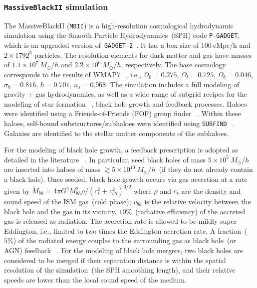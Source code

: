 \documentclass[twocolumn,trackchanges]{aastex63}
\newcommand{\mbii}{\texttt{MBII}}
\begin{document}
\subsubsection{\texttt{MassiveBlackII} simulation}
The MassiveBlackII (\mbii) is a high-resolution cosmological hydrodynamic simulation using the Smooth Particle Hydrodynamics~(SPH) code \texttt{P-GADGET}, which is an upgraded version of~\texttt{GADGET-2}~\citep{2005MNRAS.364.1105S}. It has a box size of $100~\mathrm{cMpc/h}$ and $2\times1792^3$ particles. The resolution elements for dark matter and gas have masses of $1.1\times 10^7~M_{\odot}/h$ and $2.2\times 10^6~M_{\odot}/h$, respectively. The base cosmology corresponds to the results of WMAP7 ~\citep{2011ApJS..192...18K}, i.e., $\Omega_0=0.275$, $\Omega_l=0.725$, $\Omega_b=0.046$, $\sigma_8=0.816$, $h = 0.701$, $n_s=0.968$.  The simulation includes a full modeling of gravity + gas hydrodynamics, as well as a wide range of subgrid recipes for the modeling of star formation ~\citep{2003MNRAS.339..289S}, black hole growth and feedback processes. Haloes were identified using a Friends-of-Friends (FOF) group finder ~\citep{1985ApJ...292..371D}. Within these haloes, self-bound substructures/subhaloes were identified using \texttt{SUBFIND} ~\citep{2005MNRAS.364.1105S}. Galaxies are identified to the stellar matter components of the subhaloes.

For the modeling of black hole growth, a feedback prescription is adopted as detailed in the literature ~\citep{2005Natur.433..604D, 2005MNRAS.361..776S}. In particular, seed black holes of mass $5\times 10^{5}~M_{\odot}/h$ are inserted into haloes of mass $\gtrsim 5\times 10^{10}~M_{\odot}/h$~(if they do not already contain a black hole). Once seeded, black hole growth occurs via gas accretion at a rate given by $\dot{M}_{bh}={4\pi G^2 M_{bh}^2 \rho}/{(c_s^2+v_{bh}^2)^{3/2}}$ where $\rho$ and $c_s$ are the density and sound speed of the ISM gas~(cold phase); $v_{bh}$ is the relative velocity between the black hole and the gas in its vicinity. $10\%$~(radiative efficiency) of the accreted gas is released as radiation. The accretion rate is allowed to be mildly super-Eddington, i.e., limited to two times the Eddington accretion rate. A fraction~($5\%$) of the radiated energy couples to the surrounding gas as black hole~(or AGN) feedback ~\citep{2005Natur.433..604D}. For the modeling of black hole mergers, two black holes are considered to be merged if their separation distance is within the spatial resolution of the simulation~(the SPH smoothing length), and their relative speeds are lower than the local sound speed of the medium.
\end{document}
